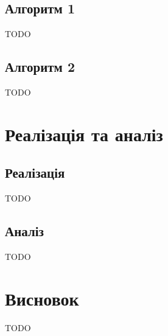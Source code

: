 \documentclass[14pt,a4paper]{extarticle}
\newcounter{e}
\numberwithin{equation}{section}
\numberwithin{figure}{section}
\begin{document}
	\subsection{Алгоритм 1}
	TODO

	\subsection{Алгоритм 2}
	TODO

	\newpage
	\thispagestyle{empty}
	\section{Реалізація та аналіз}
	
	\subsection{Реалізація}
	TODO

	\subsection{Аналіз}
	TODO
	
	\newpage
	\thispagestyle{empty}
	\section{Висновок}
	TODO
	
	\newpage
	\thispagestyle{empty}
	
	\nocite{ongie2020deep}
		
	\nocite{Adler_2017}
	\printbibliography[title={Бібліографія}]
\end{document}
